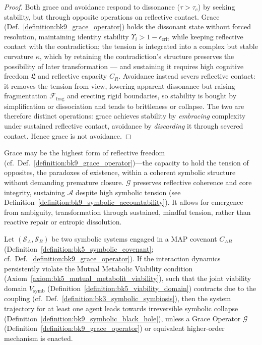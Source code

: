 \begin{proof}
\label{proof:bk9_grace_vs_avoidance}
\leavevmode
Both grace and avoidance respond to dissonance ($\tau>\tau_c$) by seeking stability, but through opposite operations on reflective contact. Grace (Def.~\ref{definition:bk9_grace_operator}) holds the dissonant state without forced resolution, maintaining identity stability $\Upsilon_i>1-\epsilon_{\text{crit}}$ while keeping reflective contact with the contradiction; the tension is integrated into a complex but stable curvature $\kappa$, which by retaining the contradiction's structure preserves the possibility of later transformation --- and sustaining it requires high cognitive freedom $\mathfrak{L}$ and reflective capacity $C_R$. Avoidance instead severs reflective contact: it removes the tension from view, lowering apparent dissonance but raising fragmentation $\mathcal{F}_{\text{frag}}$ and erecting rigid boundaries, so stability is bought by simplification or dissociation and tends to brittleness or collapse. The two are therefore distinct operations: grace achieves stability by \emph{embracing} complexity under sustained reflective contact, avoidance by \emph{discarding} it through severed contact. Hence grace is not avoidance.
\end{proof}
\begin{scholium}
\label{scholium:bk9_grace}
Grace may be the highest form of reflective freedom (cf.~Def.~\ref{definition:bk9_grace_operator})—the capacity to hold the tension of opposites, the paradoxes of existence, within a coherent symbolic structure without demanding premature closure. $\mathcal{G}$ preserves reflective coherence and core integrity, sustaining $\mathcal{A}$ despite high symbolic tension (see Definition~\ref{definition:bk9_symbolic_accountability}).
It allows for emergence from ambiguity, transformation through sustained, mindful tension, rather than reactive repair or entropic dissolution.
\end{scholium}
\begin{theorem}
\label{theorem:bk9_irreversibility_of_covenant_breach_without_grace}
Let $(\mathcal{S}_A, \mathcal{S}_B)$ be two symbolic systems engaged in a MAP covenant $C_{AB}$ (Definition~\ref{definition:bk5_symbolic_covenant}; cf.~Def.~\ref{definition:bk9_grace_operator}). If the interaction dynamics persistently violate the Mutual Metabolic Viability condition (Axiom~\ref{axiom:bk5_mutual_metabolit_viability}), such that the joint viability domain $V_{\text{symb}}$ (Definition~\ref{definition:bk5_viability_domain}) contracts due to the coupling (cf.~Def.~\ref{definition:bk3_symbolic_symbiosis}), then the system trajectory for at least one agent leads towards irreversible symbolic collapse (Definition~\ref{definition:bk9_symbolic_black_hole}), unless a Grace Operator $\mathcal{G}$ (Definition~\ref{definition:bk9_grace_operator}) or equivalent higher-order mechanism is enacted.
\end{theorem}
